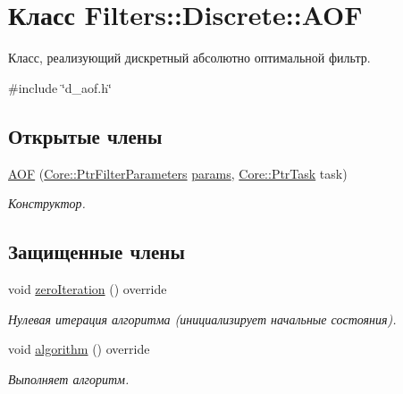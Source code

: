 \hypertarget{class_filters_1_1_discrete_1_1_a_o_f}{}\section{Класс Filters\+:\+:Discrete\+:\+:A\+OF}
\label{class_filters_1_1_discrete_1_1_a_o_f}


Класс, реализующий дискретный абсолютно оптимальной фильтр.  




{\ttfamily \#include \char`\"{}d\+\_\+aof.\+h\char`\"{}}

\subsection*{Открытые члены}
\begin{DoxyCompactItemize}
\item 
\hypertarget{class_filters_1_1_discrete_1_1_a_o_f_a2df66ff12a7b327da999b0fd1dc82759}{}\label{class_filters_1_1_discrete_1_1_a_o_f_a2df66ff12a7b327da999b0fd1dc82759} 
\hyperlink{class_filters_1_1_discrete_1_1_a_o_f_a2df66ff12a7b327da999b0fd1dc82759}{A\+OF} (\hyperlink{namespace_core_a4811af8148ba137d644b9a61a042cf03}{Core\+::\+Ptr\+Filter\+Parameters} \hyperlink{class_core_1_1_filter_a44aa749b49ba46256975ce545531ecf7}{params}, \hyperlink{namespace_core_abfda8f69fcacfcea2696549b548ed737}{Core\+::\+Ptr\+Task} task)
\begin{DoxyCompactList}\small\item\em Конструктор. \end{DoxyCompactList}\end{DoxyCompactItemize}
\subsection*{Защищенные члены}
\begin{DoxyCompactItemize}
\item 
void \hyperlink{class_filters_1_1_discrete_1_1_a_o_f_aa822fe74d7ca160f898db1c1289e17f7}{zero\+Iteration} () override
\begin{DoxyCompactList}\small\item\em Нулевая итерация алгоритма (инициализирует начальные состояния). \end{DoxyCompactList}\item 
void \hyperlink{class_filters_1_1_discrete_1_1_a_o_f_a22cbbf1054a17045c5e91ed7c5cba387}{algorithm} () override
\begin{DoxyCompactList}\small\item\em Выполняет алгоритм. \end{DoxyCompactList}\end{DoxyCompactItemize}
